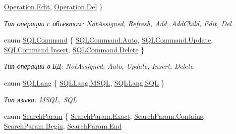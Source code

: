\begin{DoxyCompactItemize}
\mbox{\hyperlink{namespace_f_b_a_a82a9536170086556d110a52b7698a776a7dce122004969d56ae2e0245cb754d35}{Operation.\+Edit}}, 
\mbox{\hyperlink{namespace_f_b_a_a82a9536170086556d110a52b7698a776a5526d60feb55086fbd12dd96b071a093}{Operation.\+Del}}
 \}
\begin{DoxyCompactList}\small\item\em Тип операции с объектом\+: Not\+Assigned, Refresh, Add, Add\+Child, Edit, Del \end{DoxyCompactList}\item 
enum \mbox{\hyperlink{namespace_f_b_a_a73208cd254b643d096fa9a17ad6c1ffe}{S\+Q\+L\+Command}} \{ \mbox{\hyperlink{namespace_f_b_a_a73208cd254b643d096fa9a17ad6c1ffea06b9281e396db002010bde1de57262eb}{S\+Q\+L\+Command.\+Auto}}, 
\mbox{\hyperlink{namespace_f_b_a_a73208cd254b643d096fa9a17ad6c1ffea06933067aafd48425d67bcb01bba5cb6}{S\+Q\+L\+Command.\+Update}}, 
\mbox{\hyperlink{namespace_f_b_a_a73208cd254b643d096fa9a17ad6c1ffeaa458be0f08b7e4ff3c0f633c100176c0}{S\+Q\+L\+Command.\+Insert}}, 
\mbox{\hyperlink{namespace_f_b_a_a73208cd254b643d096fa9a17ad6c1ffeaf2a6c498fb90ee345d997f888fce3b18}{S\+Q\+L\+Command.\+Delete}}
 \}
\begin{DoxyCompactList}\small\item\em Тип операции в БД\+: Not\+Assigned, Auto, Update, Insert, Delete \end{DoxyCompactList}\item 
enum \mbox{\hyperlink{namespace_f_b_a_aa7137ed2c5f5027f13bb403ffc2b005e}{S\+Q\+L\+Lang}} \{ \mbox{\hyperlink{namespace_f_b_a_aa7137ed2c5f5027f13bb403ffc2b005ea0c1afcca37c20f3ebb923a15752dd1c1}{S\+Q\+L\+Lang.\+M\+S\+QL}}, 
\mbox{\hyperlink{namespace_f_b_a_aa7137ed2c5f5027f13bb403ffc2b005ea9778840a0100cb30c982876741b0b5a2}{S\+Q\+L\+Lang.\+S\+QL}}
 \}
\begin{DoxyCompactList}\small\item\em Тип языка\+: M\+S\+QL, S\+QL \end{DoxyCompactList}\item 
enum \mbox{\hyperlink{namespace_f_b_a_af87bc7599fc60514e1e5786d39387dfe}{Search\+Param}} \{ \mbox{\hyperlink{namespace_f_b_a_af87bc7599fc60514e1e5786d39387dfea1649aed298f99d587e2eb30c1db5946b}{Search\+Param.\+Exact}}, 
\mbox{\hyperlink{namespace_f_b_a_af87bc7599fc60514e1e5786d39387dfeab270372be5b4433b4736daaf25e1c74e}{Search\+Param.\+Contains}}, 
\mbox{\hyperlink{namespace_f_b_a_af87bc7599fc60514e1e5786d39387dfea1a06729125544cab7cee73195fc044f0}{Search\+Param.\+Begin}}, 
\mbox{\hyperlink{namespace_f_b_a_af87bc7599fc60514e1e5786d39387dfea87557f11575c0ad78e4e28abedc13b6e}{Search\+Param.\+End}}

\end{DoxyCompactItemize}
